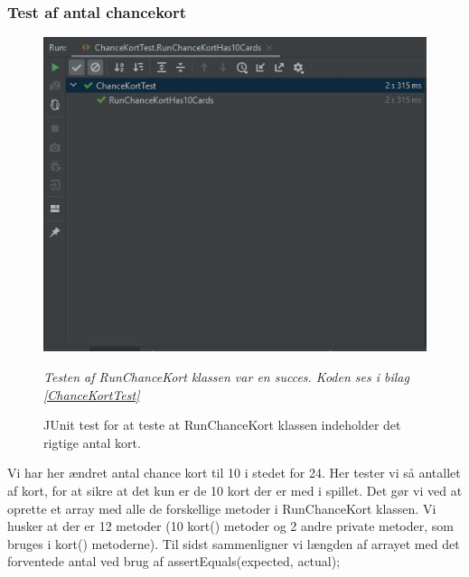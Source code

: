 \subsubsection{Test af antal chancekort}
    \begin{figure}[H]
        \centering
        \includegraphics[width=15cm]{figures/RunChanceKortHas10Cards.JPG}
        \caption{JUnit test for at teste at RunChanceKort klassen indeholder det rigtige antal kort.}
        \emph{Testen af RunChanceKort klassen var en succes. Koden ses i bilag \ref{ChanceKortTest}}
    \end{figure}
    Vi har her ændret antal chance kort til 10 i stedet for 24. Her tester vi så antallet af kort, for at sikre at det kun er de 10 kort der er med i spillet. Det gør vi ved at oprette et array med alle de forskellige metoder i RunChanceKort klassen. Vi husker at der er 12 metoder (10 kort() metoder og 2 andre private metoder, som bruges i kort() metoderne). Til sidst sammenligner vi længden af arrayet med det forventede antal ved brug af assertEquals(expected, actual);



